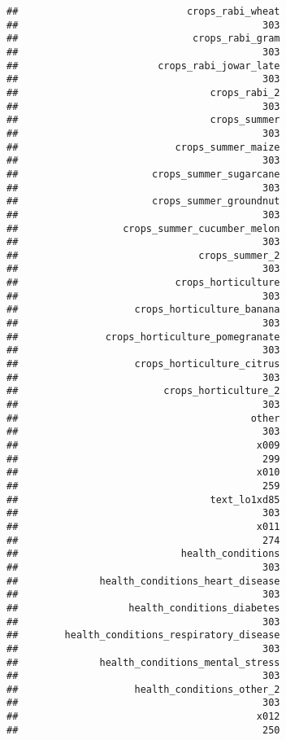 \documentclass[
]{article}
\begin{document}
\begin{verbatim}
##                             crops_rabi_wheat 
##                                          303 
##                              crops_rabi_gram 
##                                          303 
##                        crops_rabi_jowar_late 
##                                          303 
##                                 crops_rabi_2 
##                                          303 
##                                 crops_summer 
##                                          303 
##                           crops_summer_maize 
##                                          303 
##                       crops_summer_sugarcane 
##                                          303 
##                       crops_summer_groundnut 
##                                          303 
##                  crops_summer_cucumber_melon 
##                                          303 
##                               crops_summer_2 
##                                          303 
##                           crops_horticulture 
##                                          303 
##                    crops_horticulture_banana 
##                                          303 
##               crops_horticulture_pomegranate 
##                                          303 
##                    crops_horticulture_citrus 
##                                          303 
##                         crops_horticulture_2 
##                                          303 
##                                        other 
##                                          303 
##                                         x009 
##                                          299 
##                                         x010 
##                                          259 
##                                 text_lo1xd85 
##                                          303 
##                                         x011 
##                                          274 
##                            health_conditions 
##                                          303 
##              health_conditions_heart_disease 
##                                          303 
##                   health_conditions_diabetes 
##                                          303 
##        health_conditions_respiratory_disease 
##                                          303 
##              health_conditions_mental_stress 
##                                          303 
##                    health_conditions_other_2 
##                                          303 
##                                         x012 
##                                          250 

\end{verbatim}
\end{document}

